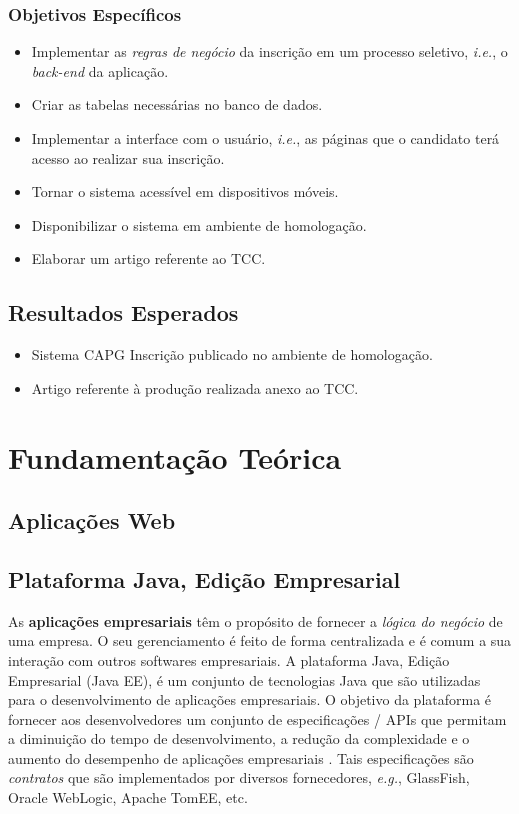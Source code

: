 \documentclass[
  10.5pt,				  %
	openright,			%
	twoside,			  %
  a5paper,
  chapter=TITLE,	%
	section=TITLE,	%
  hyphens,        %
	english,        %
	brazil          %
]{abntex2}
\begin{document}
\subsection{Objetivos Específicos}
\begin{itemize}
  \item Implementar as \emph{regras de negócio} da inscrição em um processo seletivo, \emph{i.e.}, o \emph{back-end} da aplicação.
  \item Criar as tabelas necessárias no banco de dados.
  \item Implementar a interface com o usuário, \emph{i.e.}, as páginas que o candidato terá acesso ao realizar sua inscrição.
  \item Tornar o sistema acessível em dispositivos móveis.
  \item Disponibilizar o sistema em ambiente de homologação.
  \item Elaborar um artigo referente ao TCC.
\end{itemize}

\section{Resultados Esperados}
\begin{itemize}
  \item Sistema CAPG Inscrição publicado no ambiente de homologação.
  \item Artigo referente à produção realizada anexo ao TCC.
\end{itemize}



\chapter{Fundamentação Teórica}

\section{Aplicações Web}


\section{Plataforma Java, Edição Empresarial}\label{sec:java2e}

As \textbf{aplicações empresariais} têm o propósito de fornecer a \emph{lógica do negócio} de uma empresa. O seu gerenciamento é feito de forma centralizada e é comum a sua interação com outros softwares empresariais. A plataforma Java, Edição Empresarial (Java EE), é um conjunto de tecnologias Java que são utilizadas para o desenvolvimento de aplicações empresariais. O objetivo da plataforma é fornecer aos desenvolvedores um conjunto de especificações / APIs que permitam a diminuição do tempo de desenvolvimento, a redução da complexidade e o aumento do desempenho de aplicações empresariais \cite{javaee7}. Tais especificações são \emph{contratos} que são implementados por diversos fornecedores, \emph{e.g.}, GlassFish, Oracle WebLogic, Apache TomEE, etc.
\end{document}
